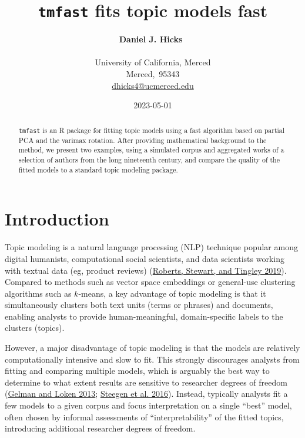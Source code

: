 \documentclass[
]{article}
\title{\texttt{tmfast} fits topic models fast}
\author{
\textbf{Daniel J. Hicks}~\orcidlink{0000-0001-7945-4416}\\\\University
of California,
Merced\\Merced,\ 95343\\\href{mailto:dhicks4@ucmerced.edu}{dhicks4@ucmerced.edu}}
\date{2023-05-01}
\renewcommand*\contentsname{Table of contents}
\newcommand\contentsname{Table of contents}
\begin{document}
\maketitle
\begin{abstract}
\texttt{tmfast} is an R package for fitting topic models using a fast
algorithm based on partial PCA and the varimax rotation. After providing
mathematical background to the method, we present two examples, using a
simulated corpus and aggregated works of a selection of authors from the
long nineteenth century, and compare the quality of the fitted models to
a standard topic modeling package.
\end{abstract}
\ifdefined\Shaded\renewenvironment{Shaded}{\begin{tcolorbox}[breakable, boxrule=0pt, frame hidden, colback={shadecolor}, enhanced]}{\end{tcolorbox}}\fi

\renewcommand*\contentsname{Table of contents}
{
\hypersetup{linkcolor=}
\setcounter{tocdepth}{3}
\tableofcontents
}
\hypertarget{introduction}{%
\section{Introduction}\label{introduction}}

Topic modeling is a natural language processing (NLP) technique popular
among digital humanists, computational social scientists, and data
scientists working with textual data (eg, product reviews)
(\protect\hyperlink{ref-RobertsStmPackageStructural2019}{Roberts,
Stewart, and Tingley 2019}). Compared to methods such as vector space
embeddings or general-use clustering algorithms such as \(k\)-means, a
key advantage of topic modeling is that it simultaneously clusters both
text units (terms or phrases) and documents, enabling analysts to
provide human-meaningful, domain-specific labels to the clusters
(topics).

However, a major disadvantage of topic modeling is that the models are
relatively computationally intensive and slow to fit. This strongly
discourages analysts from fitting and comparing multiple models, which
is arguably the best way to determine to what extent results are
sensitive to researcher degrees of freedom
(\protect\hyperlink{ref-GelmanGardenForkingPaths2013}{Gelman and Loken
2013};
\protect\hyperlink{ref-SteegenIncreasingTransparencyMultiverse2016}{Steegen
et al. 2016}). Instead, typically analysts fit a few models to a given
corpus and focus interpretation on a single ``best'' model, often chosen
by informal assessments of ``interpretability'' of the fitted topics,
introducing additional researcher degrees of freedom.
\end{document}
